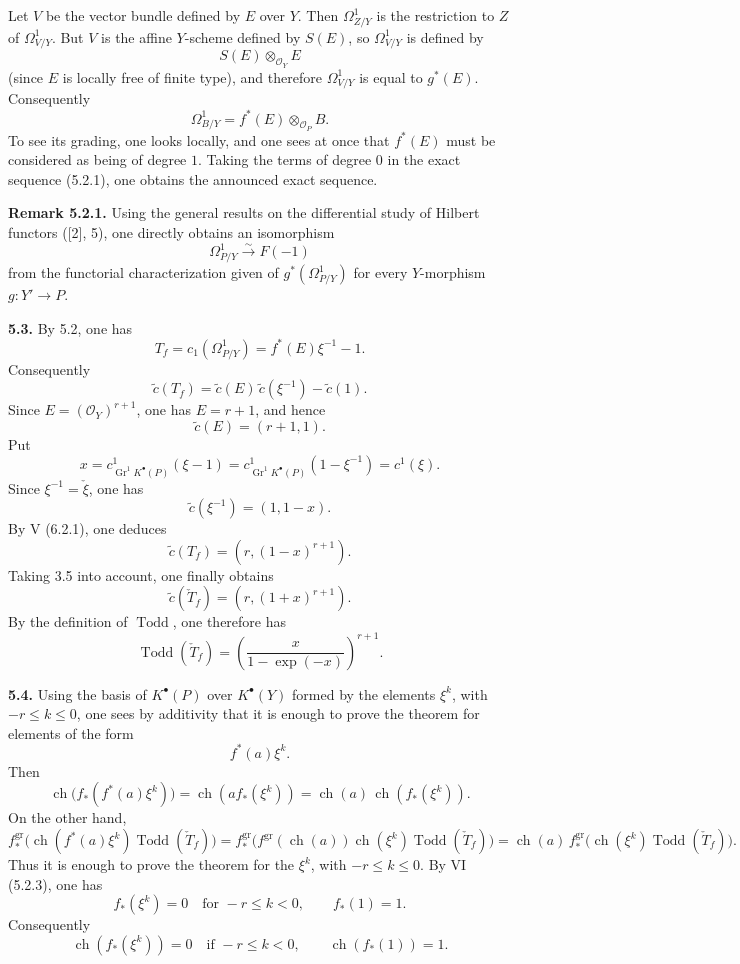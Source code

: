 \documentclass[11pt]{article}
\newcommand{\Gr}{\operatorname{Gr}}
\newcommand{\ch}{\operatorname{ch}}
\newcommand{\Todd}{\operatorname{Todd}}
\providecommand{\ch}{\operatorname{ch}}
\providecommand{\Todd}{\operatorname{Todd}}
\providecommand{\Gr}{\operatorname{Gr}}
\providecommand{\Gr}{\operatorname{G}}
\begin{document}
Let \(V\) be the vector bundle defined by \(E\) over \(Y\). Then \(\Omega^1_{Z/Y}\) is the restriction to \(Z\) of \(\Omega^1_{V/Y}\). But \(V\) is the affine \(Y\)-scheme defined by \(S(E)\), so \(\Omega^1_{V/Y}\) is defined by
\[
S(E)\otimes_{\mathcal O_Y}E
\]
(since \(E\) is locally free of finite type), and therefore \(\Omega^1_{V/Y}\) is equal to \(g^*(E)\). Consequently
\[
\Omega^1_{B/Y}=f^*(E)\otimes_{\mathcal O_P}B.
\]
To see its grading, one looks locally, and one sees at once that \(f^*(E)\) must be considered as being of degree \(1\). Taking the terms of degree \(0\) in the exact sequence (5.2.1), one obtains the announced exact sequence.

\textbf{Remark 5.2.1.} Using the general results on the differential study of Hilbert functors ([2], 5), one directly obtains an isomorphism
\[
\Omega^1_{P/Y}\xrightarrow{\sim}F(-1)
\]
from the functorial characterization given of \(g^*(\Omega^1_{P/Y})\) for every \(Y\)-morphism \(g:Y'\to P\).

\textbf{5.3.} By 5.2, one has
\[
 T_f=c_1(\Omega^1_{P/Y})=f^*(E)\xi^{-1}-1.
\]
Consequently
\[
 \widetilde c(T_f)=\widetilde c(E)\,\widetilde c(\xi^{-1})-\widetilde c(1).
\]
Since \(E=(\mathcal O_Y)^{r+1}\), one has \(E=r+1\), and hence
\[
 \widetilde c(E)=(r+1,1).
\]
Put
\[
 x=c^1_{\Gr^1K^{\bullet}(P)}(\xi-1)
 =
 c^1_{\Gr^1K^{\bullet}(P)}(1-\xi^{-1})
 =
 c^1(\xi).
\]
Since \(\xi^{-1}=\check \xi\), one has
\[
 \widetilde c(\xi^{-1})=(1,1-x).
\]
By V (6.2.1), one deduces
\[
 \widetilde c(T_f)=(r,(1-x)^{r+1}).
\]
Taking 3.5 into account, one finally obtains
\[
 \widetilde c(\check T_f)=(r,(1+x)^{r+1}).
\]
By the definition of \(\Todd\), one therefore has
\begin{equation}\tag{5.3.1}
 \Todd(\check T_f)=
 \left(\frac{x}{1-\exp(-x)}\right)^{r+1}.
\end{equation}

\textbf{5.4.} Using the basis of \(K^{\bullet}(P)\) over \(K^{\bullet}(Y)\) formed by the elements \(\xi^k\), with \(-r\leq k\leq0\), one sees by additivity that it is enough to prove the theorem for elements of the form
\[
 f^*(a)\xi^k .
\]
Then
\[
 \ch\bigl(f_*(f^*(a)\xi^k)\bigr)
 =
 \ch(a f_*(\xi^k))
 =
 \ch(a)\,\ch(f_*(\xi^k)).
\]
On the other hand,
\[
 f^{\mathrm{gr}}_*\bigl(\ch(f^*(a)\xi^k)\Todd(\check T_f)\bigr)
 =
 f^{\mathrm{gr}}_*\bigl(f^{\mathrm{gr}}(\ch(a))\ch(\xi^k)\Todd(\check T_f)\bigr)
 =
 \ch(a)\,f^{\mathrm{gr}}_*\bigl(\ch(\xi^k)\Todd(\check T_f)\bigr).
\]
Thus it is enough to prove the theorem for the \(\xi^k\), with \(-r\leq k\leq0\). By VI (5.2.3), one has
\[
 f_*(\xi^k)=0\quad\text{for }-r\leq k<0,\qquad f_*(1)=1.
\]
Consequently
\begin{equation}\tag{5.4.1}
 \ch(f_*(\xi^k))=0\quad\text{if }-r\leq k<0,\qquad
 \ch(f_*(1))=1.
\end{equation}
\end{document}
